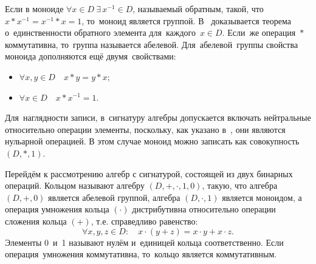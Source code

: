 Если в моноиде $\forall x\in D\ \exists \,{{x}^{-1}}\in D$, называемый обратным, такой, что~$x*{{x}^{-1}}={{x}^{-1}}*x=1$, то~моноид является группой. В~\cite{Bauman_DM, Adelson_Velskiy, Voevodin} доказывается теорема о~единственности обратного элемента для~каждого~$x\in D$. Если~же операция~$*$ коммутативна, то~группа называется абелевой. Для~абелевой~группы свойства моноида дополняются ещё двумя~свойствами:
\begin{itemize}
	\item $\forall x,y\in D\quad x*y=y*x$;
	\item $\forall x\in D\quad x*{{x}^{-1}}=1$.
\end{itemize}

Для~наглядности записи, в~сигнатуру алгебры допускается включать нейтральные относительно операции элементы, поскольку, как указано в~\cite{Bauman_DM}, они являются нульарной операцией. В этом случае моноид можно записать как совокупность $\left( D,*,1 \right)$.

Перейдём к рассмотрению алгебр с сигнатурой, состоящей из двух бинарных операций. Кольцом называют алгебру $\left( D,+,\cdot ,1,0 \right)$, такую, что алгебра $\left( D,+,0 \right)$ является абелевой группой, алгебра $\left( D,\cdot ,1 \right)$ является моноидом, а операция умножения кольца $\left( \cdot  \right)$ дистрибутивна относительно операции сложения кольца $\left( + \right)$, т.е. справедливо равенство:
\begin{equation*}
	\forall x,y,z\in D:\quad x\cdot \left( y+z \right)=x\cdot y+x\cdot z.
\end{equation*}
Элементы 0~и~1 называют нулём и~единицей кольца соответственно. Если операция~умножения коммутативна, то~кольцо является коммутативным.

